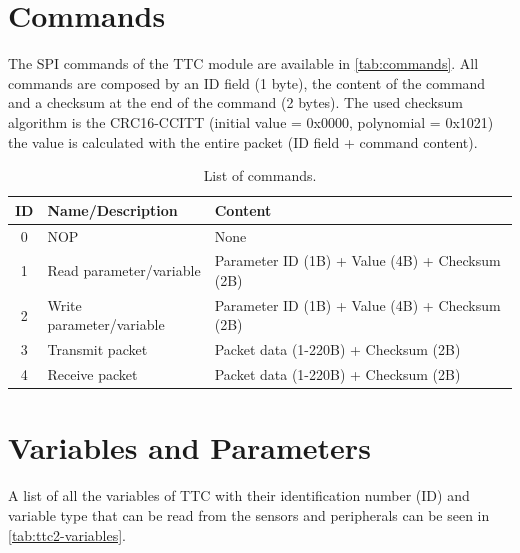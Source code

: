 \section{Commands} \label{sec:commands}

The SPI commands of the TTC module are available in \autoref{tab:commands}. All commands are composed by an ID field (1 byte), the content of the command and a checksum at the end of the command (2 bytes). The used checksum algorithm is the CRC16-CCITT  (initial value = 0x0000, polynomial = 0x1021) the value is calculated with the entire packet (ID field + command content).

\begin{table}[!h]
    \centering
    \begin{tabular}{cll}
        \toprule[1.5pt]
        \textbf{ID} & \textbf{Name/Description} & \textbf{Content}\\
        \midrule
        0   & NOP                       & None \\
        1   & Read parameter/variable   & Parameter ID (1B) + Value (4B) + Checksum (2B) \\
        2   & Write parameter/variable  & Parameter ID (1B) + Value (4B) + Checksum (2B) \\
        3   & Transmit packet           & Packet data (1-220B) + Checksum (2B) \\
        4   & Receive packet            & Packet data (1-220B) + Checksum (2B) \\
        \bottomrule[1.5pt]
    \end{tabular}
    \caption{List of commands.}
    \label{tab:commands}
\end{table}

\section{Variables and Parameters} \label{sec:variables}

A list of all the variables of TTC with their identification number (ID) and variable type that can be read from the sensors and peripherals can be seen in \autoref{tab:ttc2-variables}.

